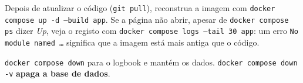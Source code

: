 \documentclass[11pt,a4paper]{article}
\begin{document}
Depois de atualizar o código (\texttt{git pull}), reconstrua a imagem com
\texttt{docker compose up -d --build app}. Se a página não abrir, apesar de
\texttt{docker compose ps} dizer \emph{Up}, veja o registo com
\texttt{docker compose logs --tail 30 app}: um erro \texttt{No module named \dots}
significa que a imagem está mais antiga que o código.

\begin{careful}
\texttt{docker compose down} para o logbook e mantém os dados.
\texttt{docker compose down -v} \textbf{apaga a base de dados}.
\end{careful}
\end{document}
